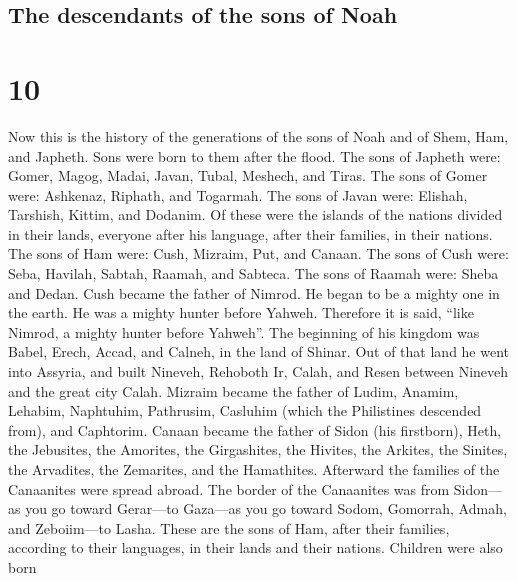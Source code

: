 \hypertarget{the-descendants-of-the-sons-of-noah}{%
\subsection{The descendants of the sons of
Noah}\label{the-descendants-of-the-sons-of-noah}}

\hypertarget{section-9}{%
\section{10}\label{section-9}}

 Now this is the history of the generations of the sons of
Noah and of Shem, Ham, and Japheth. Sons were born to them after the
flood.  The sons of Japheth were: Gomer, Magog, Madai,
Javan, Tubal, Meshech, and Tiras.  The sons of Gomer were:
Ashkenaz, Riphath, and Togarmah.  The sons of Javan were:
Elishah, Tarshish, Kittim, and Dodanim.  Of these were the
islands of the nations divided in their lands, everyone after his
language, after their families, in their nations.  The
sons of Ham were: Cush, Mizraim, Put, and Canaan.  The
sons of Cush were: Seba, Havilah, Sabtah, Raamah, and Sabteca. The sons
of Raamah were: Sheba and Dedan.  Cush became the father
of Nimrod. He began to be a mighty one in the earth.  He
was a mighty hunter before Yahweh. Therefore it is said, ``like Nimrod,
a mighty hunter before Yahweh''.  The beginning of his
kingdom was Babel, Erech, Accad, and Calneh, in the land of Shinar.
 Out of that land he went into Assyria, and built
Nineveh, Rehoboth Ir, Calah,  and Resen between Nineveh
and the great city Calah.  Mizraim became the father of
Ludim, Anamim, Lehabim, Naphtuhim,  Pathrusim, Casluhim
(which the Philistines descended from), and Caphtorim. 
Canaan became the father of Sidon (his firstborn), Heth, 
the Jebusites, the Amorites, the Girgashites,  the
Hivites, the Arkites, the Sinites,  the Arvadites, the
Zemarites, and the Hamathites. Afterward the families of the Canaanites
were spread abroad.  The border of the Canaanites was
from Sidon---as you go toward Gerar---to Gaza---as you go toward Sodom,
Gomorrah, Admah, and Zeboiim---to Lasha.  These are the
sons of Ham, after their families, according to their languages, in
their lands and their nations.  Children were also born
